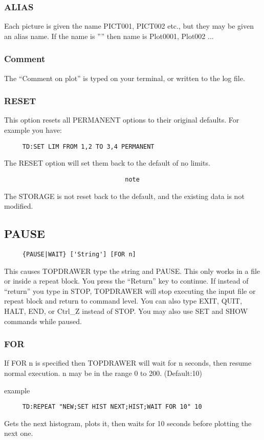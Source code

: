 \subsubsection{ALIAS}
Each  picture  is given the name PICT001, PICT002 etc., but they may be
given an alias name.  If the name is '''' then name is Plot0001,  Plot002
...  
\subsubsection{Comment}
The  ``Comment on plot'' is typed on your terminal, or written to the log
file.  
\subsubsection{RESET}
This  option  resets  all PERMANENT options to their original defaults.
For example you have:  
\begin{verbatim}
     TD:SET LIM FROM 1,2 TO 3,4 PERMANENT 
\end{verbatim}
The RESET option will set them back to the default of no limits.  
\begin{verbatim}
                                 note
\end{verbatim}
The  STORAGE is not reset back to the default, and the existing data is
not modified.  
\subsection{PAUSE}
\begin{verbatim}
     {PAUSE|WAIT} ['String'] [FOR n] 
\end{verbatim}

This  causes  TOPDRAWER  type the string and PAUSE.  This only works in a
file or inside a repeat block.  You press the ``Return'' key  to  continue.
If  instead  of  ``return'' you type in STOP, TOPDRAWER will stop executing
the input file or repeat block and return to command level.  You can also
type  EXIT, QUIT, HALT, END, or Ctrl\_Z instead of STOP.  You may also use
SET and SHOW commands while paused.  
\subsubsection{FOR}
If  FOR  n  is  specified  then TOPDRAWER will wait for n seconds, then
resume normal execution.  n may be in the range 0 to 200.  (Default:10) 

example 
\begin{verbatim}
     TD:REPEAT "NEW;SET HIST NEXT;HIST;WAIT FOR 10" 10 
\end{verbatim}
Gets  the  next  histogram,  plots it, then waits for 10 seconds before
plotting the next one.  
